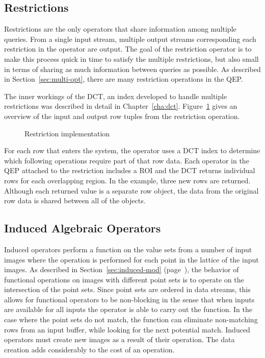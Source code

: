 \documentclass{ucdthesis}       %
\begin{document}
\subsection{Restrictions}
\label{sec:restriction-op}

Restrictions are the only operators that share information among
multiple queries.  From a single input stream, multiple output streams
corresponding each restriction in the operator are output.  The goal
of the restriction operator is to make this process quick in time to
satisfy the multiple restrictions, but also small in terms of sharing
as much information between queries as possible.  As described in
Section~\ref{sec:multi-opt}, there are many restriction operations in
the \ac{QEP}.

The inner workings of the \ac{DCT}, an index developed to handle
multiple restrictions was described in detail in
Chapter~\ref{cha:dct}.  Figure~\ref{fig:restriction-ex} gives an
overview of the input and output row tuples from the restriction
operation.

\begin{figure}[htb]
  \centering
  
  \caption{Restriction implementation}
  \label{fig:restriction-ex}
\end{figure}

For each row that enters the system, the operator uses a \ac{DCT}
index to determine which following operations require part of that
row data.  Each operator in the \ac{QEP} attached to the
restriction includes a \ac{ROI} and the \ac{DCT} returns individual
rows for each overlapping region.  In the example, three new rows
are returned.  Although each returned value is a separate row
object, the data from the original row data is shared between all
of the objects.

\subsection{Induced Algebraic Operators}
\label{sec:induced-op}

Induced operators perform a function on the value sets from a number
of input images where the operation is performed for each point in the
lattice of the input images.  As described in
Section~\ref{sec:induced-mod} (page~\pageref{sec:induced-mod}), the
behavior of functional operations on images with different point sets
is to operate on the intersection of the point sets.  Since point sets
are ordered in data streams, this allows for functional operators to
be non-blocking in the sense that when inputs are available for all
inputs the operator is able to carry out the function.  In the
case where the point sets do not match, the function can eliminate
non-matching rows from an input buffer, while looking for the next
potential match.  Induced operators must create new images as a result
of their operation.  The data creation adds considerably to the cost
of an operation.
\end{document}
